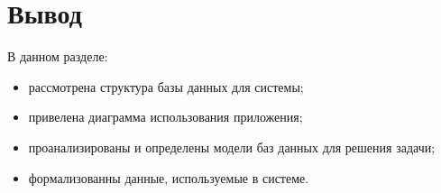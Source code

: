 \section*{Вывод}

В данном разделе:
\begin{itemize}
    \item рассмотрена структура базы данных для системы;
    \item привелена диаграмма использования приложения;
    \item проанализированы и определены модели баз данных для решения задачи;
    \item формализованны данные, используемые в системе.
\end{itemize}
